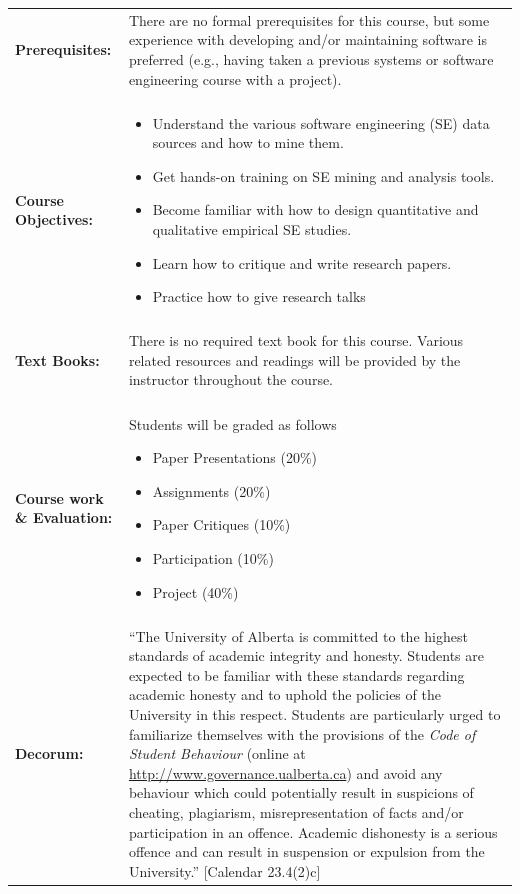 \documentclass[12pt]{article}
\newcommand{\newsec}[1]{\\ \textbf{#1:}}
\begin{document}
\begin{longtable}{p{}p{}}
\newsec{Prerequisites} &There are no formal prerequisites for this course, but some experience with developing and/or maintaining software is preferred (e.g., having taken a previous systems or software engineering course with a project).\\

\newsec{Course Objectives}&
\begin{itemize}
\item Understand the various software engineering (SE) data sources and how to mine them.
\item Get hands-on training on SE mining and analysis tools.
\item Become familiar with how to design quantitative and qualitative empirical SE studies.
\item Learn how to critique and write research papers.
\item Practice how to give research talks
\end{itemize}\\

\newsec{Text Books} &There is no required text book for this course. Various related resources and readings will be provided by the instructor throughout the course.\\

\newsec{Course work \& Evaluation}& Students will be graded as follows
\begin{itemize}
\item Paper Presentations (20\%)
\item Assignments (20\%)
\item Paper Critiques (10\%)
\item Participation (10\%)
\item Project (40\%)
\end{itemize}\\

\newsec{Decorum}&
``The University of Alberta is committed to the highest standards of academic integrity and honesty. Students are expected to be familiar with these standards regarding academic honesty and to uphold the policies of the University in this respect. Students are particularly urged to familiarize themselves with the provisions of the \textit{Code of Student Behaviour }(online at \url{http://www.governance.ualberta.ca}) and avoid any behaviour which could potentially result in suspicions of cheating, plagiarism, misrepresentation of facts and/or participation in an offence. Academic dishonesty is a serious offence and can result in suspension or expulsion from the University.'' [Calendar 23.4(2)c]


\end{longtable}
\end{document}
